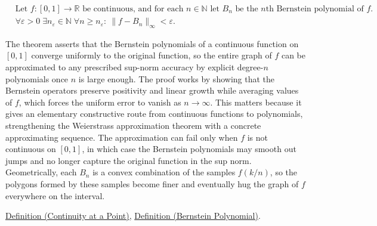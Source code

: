 \begin{remark*}
\[
\begin{aligned}
&\text{Let } f:[0,1]\to\mathbb{R} \text{ be continuous, and for each } n\in\mathbb{N} \text{ let } B_n \text{ be the $n$th Bernstein polynomial of } f.\\
&\forall \varepsilon>0\;\exists n_\varepsilon\in\mathbb{N}\;\forall n\ge n_\varepsilon:\ \|f-B_n\|_\infty<\varepsilon.
\end{aligned}
\]
\end{remark*}

\begin{remark*}[Interpretation]
The theorem asserts that the Bernstein polynomials of a continuous function on $[0,1]$ converge uniformly to the original function, so the entire graph of $f$ can be approximated to any prescribed sup-norm accuracy by explicit degree-$n$ polynomials once $n$ is large enough. The proof works by showing that the Bernstein operators preserve positivity and linear growth while averaging values of $f$, which forces the uniform error to vanish as $n\to\infty$. This matters because it gives an elementary constructive route from continuous functions to polynomials, strengthening the Weierstrass approximation theorem with a concrete approximating sequence. The approximation can fail only when $f$ is not continuous on $[0,1]$, in which case the Bernstein polynomials may smooth out jumps and no longer capture the original function in the sup norm. Geometrically, each $B_n$ is a convex combination of the samples $f(k/n)$, so the polygons formed by these samples become finer and eventually hug the graph of $f$ everywhere on the interval.
\end{remark*}

\begin{dependencies}
\hyperref[def:continuous-at-point]{Definition (Continuity at a Point)}, \hyperref[def:bernstein-polynomial]{Definition (Bernstein Polynomial)}.
\end{dependencies}
